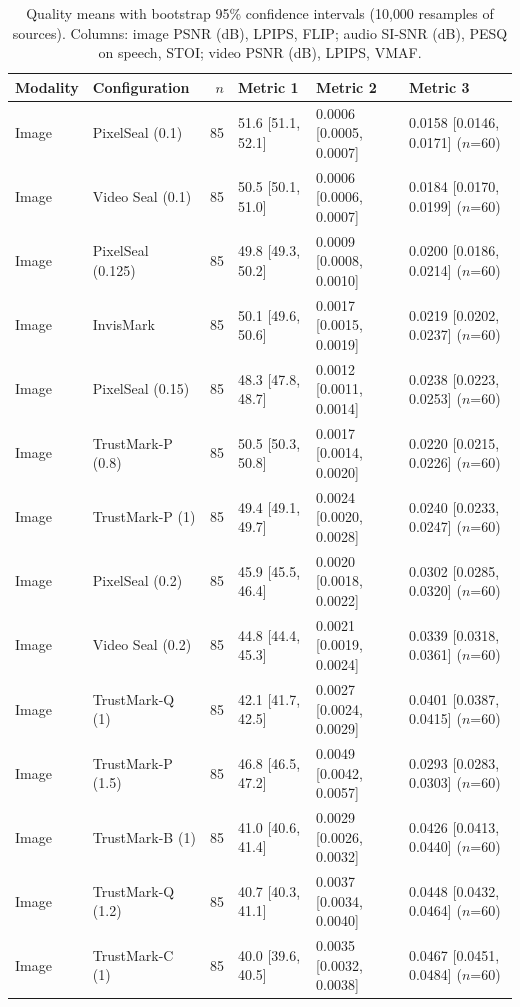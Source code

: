 \begin{table}[!t]
\centering
\footnotesize
\caption{Quality means with bootstrap 95\% confidence intervals (10{,}000 resamples of sources). Columns: image PSNR (dB), LPIPS, FLIP; audio SI-SNR (dB), PESQ on speech, STOI; video PSNR (dB), LPIPS, VMAF.}
\label{tab:ci}
\setlength{\tabcolsep}{3.4pt}
\begin{tabular}{llrlll}
\toprule
Modality & Configuration & $n$ & Metric 1 & Metric 2 & Metric 3 \\
\midrule
Image & PixelSeal (0.1) & 85 & 51.6 [51.1, 52.1] & 0.0006 [0.0005, 0.0007] & 0.0158 [0.0146, 0.0171] \tiny($n$=60) \\
Image & Video Seal (0.1) & 85 & 50.5 [50.1, 51.0] & 0.0006 [0.0006, 0.0007] & 0.0184 [0.0170, 0.0199] \tiny($n$=60) \\
Image & PixelSeal (0.125) & 85 & 49.8 [49.3, 50.2] & 0.0009 [0.0008, 0.0010] & 0.0200 [0.0186, 0.0214] \tiny($n$=60) \\
Image & InvisMark & 85 & 50.1 [49.6, 50.6] & 0.0017 [0.0015, 0.0019] & 0.0219 [0.0202, 0.0237] \tiny($n$=60) \\
Image & PixelSeal (0.15) & 85 & 48.3 [47.8, 48.7] & 0.0012 [0.0011, 0.0014] & 0.0238 [0.0223, 0.0253] \tiny($n$=60) \\
Image & TrustMark-P (0.8) & 85 & 50.5 [50.3, 50.8] & 0.0017 [0.0014, 0.0020] & 0.0220 [0.0215, 0.0226] \tiny($n$=60) \\
Image & TrustMark-P (1) & 85 & 49.4 [49.1, 49.7] & 0.0024 [0.0020, 0.0028] & 0.0240 [0.0233, 0.0247] \tiny($n$=60) \\
Image & PixelSeal (0.2) & 85 & 45.9 [45.5, 46.4] & 0.0020 [0.0018, 0.0022] & 0.0302 [0.0285, 0.0320] \tiny($n$=60) \\
Image & Video Seal (0.2) & 85 & 44.8 [44.4, 45.3] & 0.0021 [0.0019, 0.0024] & 0.0339 [0.0318, 0.0361] \tiny($n$=60) \\
Image & TrustMark-Q (1) & 85 & 42.1 [41.7, 42.5] & 0.0027 [0.0024, 0.0029] & 0.0401 [0.0387, 0.0415] \tiny($n$=60) \\
Image & TrustMark-P (1.5) & 85 & 46.8 [46.5, 47.2] & 0.0049 [0.0042, 0.0057] & 0.0293 [0.0283, 0.0303] \tiny($n$=60) \\
Image & TrustMark-B (1) & 85 & 41.0 [40.6, 41.4] & 0.0029 [0.0026, 0.0032] & 0.0426 [0.0413, 0.0440] \tiny($n$=60) \\
Image & TrustMark-Q (1.2) & 85 & 40.7 [40.3, 41.1] & 0.0037 [0.0034, 0.0040] & 0.0448 [0.0432, 0.0464] \tiny($n$=60) \\
Image & TrustMark-C (1) & 85 & 40.0 [39.6, 40.5] & 0.0035 [0.0032, 0.0038] & 0.0467 [0.0451, 0.0484] \tiny($n$=60) \\

\end{tabular}
\end{table}
